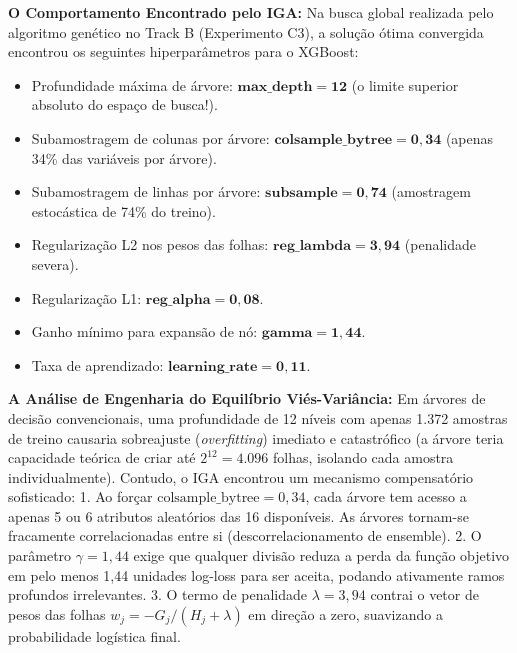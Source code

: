 \documentclass[10pt,a4paper]{article}
\begin{document}
\begin{defesabox}
\textbf{O Comportamento Encontrado pelo IGA:}
Na busca global realizada pelo algoritmo genético no Track B (Experimento C3), a solução ótima convergida encontrou os seguintes hiperparâmetros para o XGBoost:
\begin{itemize}[leftmargin=*,itemsep=1pt]
  \item Profundidade máxima de árvore: $\mathbf{\text{max\_depth} = 12}$ (o limite superior absoluto do espaço de busca!).
  \item Subamostragem de colunas por árvore: $\mathbf{\text{colsample\_bytree} = 0,34}$ (apenas 34\% das variáveis por árvore).
  \item Subamostragem de linhas por árvore: $\mathbf{\text{subsample} = 0,74}$ (amostragem estocástica de 74\% do treino).
  \item Regularização L2 nos pesos das folhas: $\mathbf{\text{reg\_lambda} = 3,94}$ (penalidade severa).
  \item Regularização L1: $\mathbf{\text{reg\_alpha} = 0,08}$.
  \item Ganho mínimo para expansão de nó: $\mathbf{\text{gamma} = 1,44}$.
  \item Taxa de aprendizado: $\mathbf{\text{learning\_rate} = 0,11}$.
\end{itemize}

\textbf{A Análise de Engenharia do Equilíbrio Viés-Variância:}
Em árvores de decisão convencionais, uma profundidade de 12 níveis com apenas 1.372 amostras de treino causaria sobreajuste (\textit{overfitting}) imediato e catastrófico (a árvore teria capacidade teórica de criar até $2^{12} = 4.096$ folhas, isolando cada amostra individualmente).
Contudo, o IGA encontrou um mecanismo compensatório sofisticado:
1. Ao forçar $\text{colsample\_bytree} = 0,34$, cada árvore tem acesso a apenas 5 ou 6 atributos aleatórios das 16 disponíveis. As árvores tornam-se fracamente correlacionadas entre si (descorrelacionamento de ensemble).
2. O parâmetro $\gamma = 1,44$ exige que qualquer divisão reduza a perda da função objetivo em pelo menos 1,44 unidades log-loss para ser aceita, podando ativamente ramos profundos irrelevantes.
3. O termo de penalidade $\lambda = 3,94$ contrai o vetor de pesos das folhas $w_j = -G_j / (H_j + \lambda)$ em direção a zero, suavizando a probabilidade logística final.
\end{defesabox}
\end{document}
